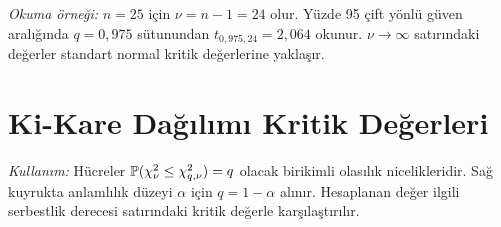 \begin{center}
{\begin{tabular}{c*{5}{r}}
\bottomrule
\end{tabular}
}
\end{center}

\textit{Okuma örneği:} $n=25$ için $\nu=n-1=24$ olur. Yüzde 95 çift yönlü
güven aralığında $q=0{,}975$ sütunundan $t_{0{,}975,24}=2{,}064$ okunur.
$\nu\to\infty$ satırındaki değerler standart normal kritik değerlerine yaklaşır.


\clearpage
\section{Ki-Kare Dağılımı Kritik Değerleri}
\label{sec:chi-square-table}
\textit{Kullanım:} Hücreler $\P(\chi^2_\nu\leq\chi^2_{q,\nu})=q$ olacak
birikimli olasılık nicelikleridir. Sağ kuyrukta anlamlılık düzeyi $\alpha$
için $q=1-\alpha$ alınır. Hesaplanan değer ilgili serbestlik derecesi
satırındaki kritik değerle karşılaştırılır.

